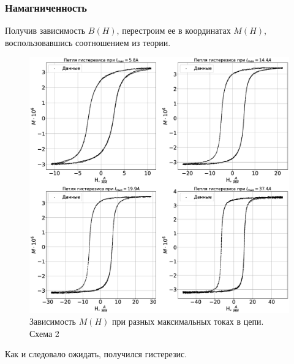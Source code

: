 \documentclass[a4paper,14pt]{extarticle}
\begin{document}
			\subsubsection{Намагниченность}
				Получив зависимость $B(H)$, перестроим ее в координатах $M(H)$, воспользовавшись соотношением из теории.
				\begin{figure}[h]
					\centering
					\includegraphics[width=1.0\linewidth]{Lab2_4.eps}
					\caption{Зависимость $M(H)$ при разных максимальных токах в цепи. Схема 2}
					\label{fig7}
				\end{figure}
				Как и следовало ожидать, получился гистерезис.
\end{document}
